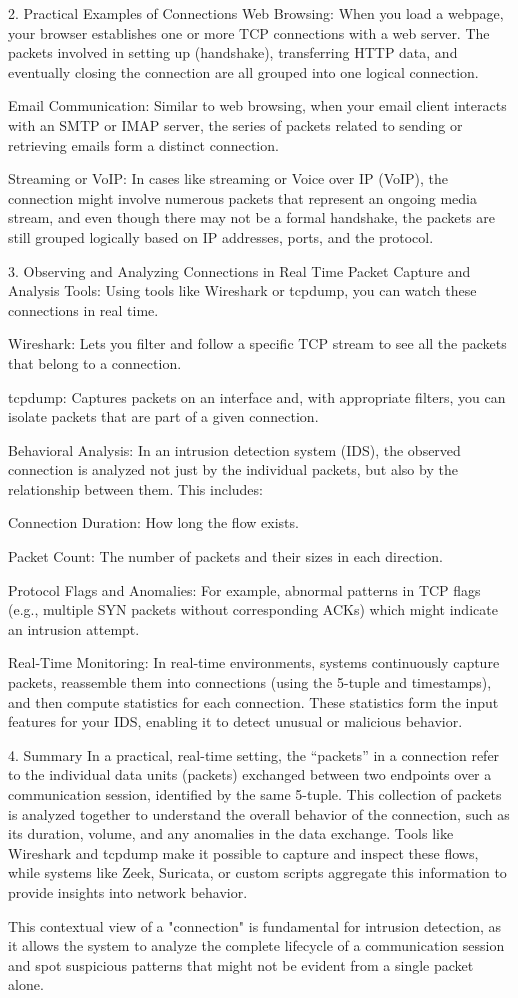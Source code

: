 \documentclass{article}
\begin{document}
2. Practical Examples of Connections
Web Browsing:
When you load a webpage, your browser establishes one or more TCP connections with a web server. The packets involved in setting up (handshake), transferring HTTP data, and eventually closing the connection are all grouped into one logical connection.

Email Communication:
Similar to web browsing, when your email client interacts with an SMTP or IMAP server, the series of packets related to sending or retrieving emails form a distinct connection.

Streaming or VoIP:
In cases like streaming or Voice over IP (VoIP), the connection might involve numerous packets that represent an ongoing media stream, and even though there may not be a formal handshake, the packets are still grouped logically based on IP addresses, ports, and the protocol.

3. Observing and Analyzing Connections in Real Time
Packet Capture and Analysis Tools:
Using tools like Wireshark or tcpdump, you can watch these connections in real time.

Wireshark: Lets you filter and follow a specific TCP stream to see all the packets that belong to a connection.

tcpdump: Captures packets on an interface and, with appropriate filters, you can isolate packets that are part of a given connection.

Behavioral Analysis:
In an intrusion detection system (IDS), the observed connection is analyzed not just by the individual packets, but also by the relationship between them. This includes:

Connection Duration: How long the flow exists.

Packet Count: The number of packets and their sizes in each direction.

Protocol Flags and Anomalies: For example, abnormal patterns in TCP flags (e.g., multiple SYN packets without corresponding ACKs) which might indicate an intrusion attempt.

Real-Time Monitoring:
In real-time environments, systems continuously capture packets, reassemble them into connections (using the 5-tuple and timestamps), and then compute statistics for each connection. These statistics form the input features for your IDS, enabling it to detect unusual or malicious behavior.

4. Summary
In a practical, real-time setting, the “packets” in a connection refer to the individual data units (packets) exchanged between two endpoints over a communication session, identified by the same 5-tuple. This collection of packets is analyzed together to understand the overall behavior of the connection, such as its duration, volume, and any anomalies in the data exchange. Tools like Wireshark and tcpdump make it possible to capture and inspect these flows, while systems like Zeek, Suricata, or custom scripts aggregate this information to provide insights into network behavior.

This contextual view of a "connection" is fundamental for intrusion detection, as it allows the system to analyze the complete lifecycle of a communication session and spot suspicious patterns that might not be evident from a single packet alone.
\end{document}
